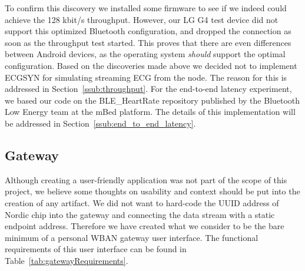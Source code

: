 To confirm this discovery we installed some firmware \cite{nordic:throughputtest} to see if we indeed could achieve the 128 kbit/s throughput. However, our LG G4 test device did not support this optimized Bluetooth configuration, and dropped the connection as soon as the throughput test started. This proves that there are even differences between Android devices, as the operating system \emph{should} support the optimal configuration. Based on the discoveries made above we decided not to implement ECGSYN for simulating streaming ECG from the node. The reason for this is addressed in Section~\ref{ssub:throughput}. For the end-to-end latency experiment, we based our code on the BLE\_HeartRate repository \cite{mbed:bleheartrate} published by the Bluetooth Low Energy team at the mBed platform. The details of this implementation will be addressed in Section~\ref{ssub:end_to_end_latency}.


\subsection{Gateway} %
\label{sub:gateway}

Although creating a user-friendly application was not part of the scope of this project, we believe some thoughts on usability and context should be put into the creation of any artifact. We did not want to hard-code the UUID address of Nordic chip into the gateway and connecting the data stream with a static endpoint address. Therefore we have created what we consider to be the bare minimum of a personal WBAN gateway user interface. The functional requirements of this user interface can be found in Table~\ref{tab:gatewayRequirements}.

